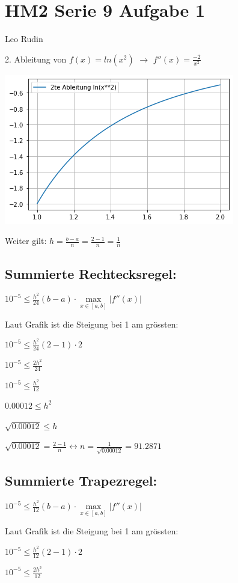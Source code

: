 \documentclass{article}
\begin{document}
\section*{HM2 Serie 9 Aufgabe 1}
Leo Rudin

2. Ableitung von \(f(x) = ln(x^2)\) \(\rightarrow\) \(f''(x) = \frac{-2}{x^2}\)

\includegraphics[scale=0.5]{2_diff.png}

Weiter gilt: \(h = \frac{b-a}{n} = \frac{2-1}{n} = \frac{1}{n}\)

\subsection*{Summierte Rechtecksregel:}
\(10^{-5} \leq \frac{h^2}{24}(b-a) \cdot \max\limits_{x \in [a,b]} |f''(x)|\)

Laut Grafik ist die Steigung bei 1 am grössten:

\(10^{-5} \leq \frac{h^2}{24}(2-1) \cdot 2\)

\(10^{-5} \leq \frac{2h^2}{24}\)

\(10^{-5} \leq \frac{h^2}{12}\)

\(0.00012 \leq h^2\)

\(\sqrt{0.00012} \leq h\)

\(\sqrt{0.00012} = \frac{2-1}{n} \leftrightarrow n = \frac{1}{\sqrt{0.00012}} = 91.2871\)

\subsection*{Summierte Trapezregel:}
\(10^{-5} \leq \frac{h^2}{12}(b-a) \cdot \max\limits_{x \in [a,b]} |f''(x)|\)

Laut Grafik ist die Steigung bei 1 am grössten:

\(10^{-5} \leq \frac{h^2}{12}(2-1) \cdot 2\)

\(10^{-5} \leq \frac{2h^2}{12}\)
\end{document}
